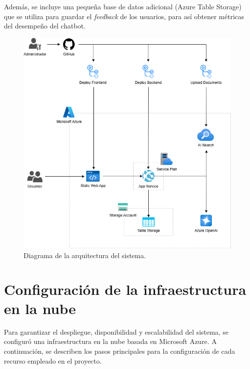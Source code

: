 Además, se incluye una pequeña base de datos adicional (Azure Table Storage) que se utiliza para guardar el \textit{feedback} de los usuarios, 
para así obtener métricas del desempeño del chatbot.  

\vspace{10mm}

\begin{figure}[ht]
	\centering
	\includegraphics[scale=.55]{./Figures/arquitectura.png}
	\caption{Diagrama de la arquitectura del sistema.}
	\label{fig:architecture}
\end{figure}

\vspace{5mm}

\section{Configuración de la infraestructura en la nube}

Para garantizar el despliegue, disponibilidad y escalabilidad del sistema, se configuró una infraestructura en la nube basada en Microsoft Azure. 
A continuación, se describen los pasos principales para la configuración de cada recurso empleado en el proyecto.

